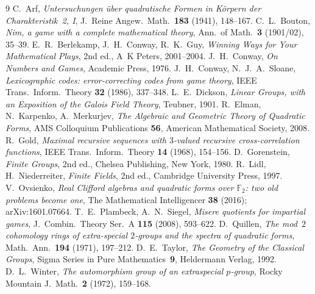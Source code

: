 \documentclass[11pt]{article}
\theoremstyle{plain}
\theoremstyle{definition}
\newcommand{\F}{\mathbb{F}}
\begin{document}
\begin{thebibliography}{9}
 C.~Arf, \emph{Untersuchungen \"uber quadratische Formen in
K\"orpern der Charakteristik~2, I}, J.\ Reine Angew.\ Math.\ \textbf{183}
(1941), 148--167.
 C.~L.~Bouton, \emph{Nim, a game with a complete mathematical
theory}, Ann.\ of Math.\ \textbf{3} (1901/02), 35--39.
 E.~R.~Berlekamp, J.~H.~Conway, R.~K.~Guy, \emph{Winning Ways for
Your Mathematical Plays}, 2nd ed., A~K Peters, 2001--2004.
 J.~H.~Conway, \emph{On Numbers and Games}, Academic Press,
1976.
 J.~H.~Conway, N.~J.~A.~Sloane, \emph{Lexicographic
codes: error-correcting codes from game theory}, IEEE Trans.\ Inform.\
Theory \textbf{32} (1986), 337--348.
 L.~E.~Dickson, \emph{Linear Groups, with an Exposition of
the Galois Field Theory}, Teubner, 1901.
 R.~Elman, N.~Karpenko, A.~Merkurjev, \emph{The Algebraic and
Geometric Theory of Quadratic Forms}, AMS Colloquium Publications
\textbf{56}, American Mathematical Society, 2008.
 R.~Gold, \emph{Maximal recursive sequences with $3$-valued
recursive cross-correlation functions}, IEEE Trans.\ Inform.\ Theory
\textbf{14} (1968), 154--156.
 D.~Gorenstein, \emph{Finite Groups}, 2nd ed.,
Chelsea Publishing, New York, 1980.
 R.~Lidl, H.~Niederreiter, \emph{Finite Fields}, 2nd ed.,
Cambridge University Press, 1997.
 V.~Ovsienko, \emph{Real Clifford algebras and quadratic
forms over $\F_2$: two old problems become one}, The Mathematical Intelligencer
\textbf{38} (2016); arXiv:1601.07664.
 T.~E.~Plambeck, A.~N.~Siegel, \emph{Misere quotients for impartial
games}, J.\ Combin.\ Theory Ser.\ A \textbf{115} (2008), 593--622.
\bibitem{Quillen71} D.~Quillen, \emph{The mod~$2$ cohomology rings of
extra-special $2$-groups and the spectra of quadratic forms}, Math.\ Ann.\
\textbf{194} (1971), 197--212.
\bibitem{Taylor} D.~E.~Taylor, \emph{The Geometry of the Classical Groups},
Sigma Series in Pure Mathematics~\textbf{9}, Heldermann Verlag, 1992.
\bibitem{Winter72} D.~L.~Winter, \emph{The automorphism group of an
extraspecial $p$-group}, Rocky Mountain J.\ Math.\ \textbf{2} (1972),
159--168.
\end{thebibliography}
\end{document}

